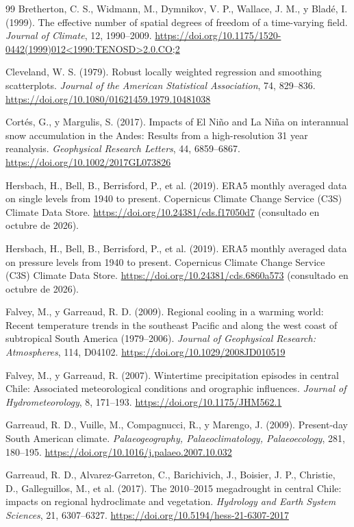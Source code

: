 \documentclass[11pt,a4paper]{article}
\begin{document}
\begin{thebibliography}{99}
 Bretherton, C. S., Widmann, M., Dymnikov, V. P., Wallace, J. M., y Bladé, I. (1999). The effective number of spatial degrees of freedom of a time-varying field. \emph{Journal of Climate}, 12, 1990--2009. \url{https://doi.org/10.1175/1520-0442(1999)012<1990:TENOSD>2.0.CO;2}

 Cleveland, W. S. (1979). Robust locally weighted regression and smoothing scatterplots. \emph{Journal of the American Statistical Association}, 74, 829--836. \url{https://doi.org/10.1080/01621459.1979.10481038}

 Cortés, G., y Margulis, S. (2017). Impacts of El Niño and La Niña on interannual snow accumulation in the Andes: Results from a high-resolution 31 year reanalysis. \emph{Geophysical Research Letters}, 44, 6859--6867. \url{https://doi.org/10.1002/2017GL073826}

 Hersbach, H., Bell, B., Berrisford, P., et al. (2019). ERA5 monthly averaged data on single levels from 1940 to present. Copernicus Climate Change Service (C3S) Climate Data Store. \url{https://doi.org/10.24381/cds.f17050d7} (consultado en octubre de 2026).

 Hersbach, H., Bell, B., Berrisford, P., et al. (2019). ERA5 monthly averaged data on pressure levels from 1940 to present. Copernicus Climate Change Service (C3S) Climate Data Store. \url{https://doi.org/10.24381/cds.6860a573} (consultado en octubre de 2026).

 Falvey, M., y Garreaud, R. D. (2009). Regional cooling in a warming world: Recent temperature trends in the southeast Pacific and along the west coast of subtropical South America (1979--2006). \emph{Journal of Geophysical Research: Atmospheres}, 114, D04102. \url{https://doi.org/10.1029/2008JD010519}

 Falvey, M., y Garreaud, R. (2007). Wintertime precipitation episodes in central Chile: Associated meteorological conditions and orographic influences. \emph{Journal of Hydrometeorology}, 8, 171--193. \url{https://doi.org/10.1175/JHM562.1}

 Garreaud, R. D., Vuille, M., Compagnucci, R., y Marengo, J. (2009). Present-day South American climate. \emph{Palaeogeography, Palaeoclimatology, Palaeoecology}, 281, 180--195. \url{https://doi.org/10.1016/j.palaeo.2007.10.032}

 Garreaud, R. D., Alvarez-Garreton, C., Barichivich, J., Boisier, J. P., Christie, D., Galleguillos, M., et al. (2017). The 2010--2015 megadrought in central Chile: impacts on regional hydroclimate and vegetation. \emph{Hydrology and Earth System Sciences}, 21, 6307--6327. \url{https://doi.org/10.5194/hess-21-6307-2017}


\end{thebibliography}
\end{document}
